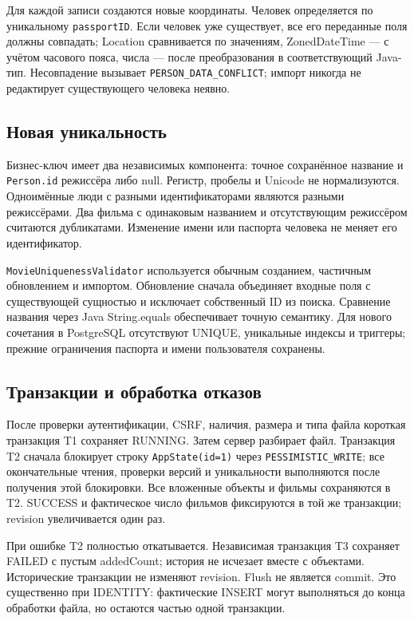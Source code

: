 Для каждой записи создаются новые координаты. Человек определяется по уникальному \texttt{passportID}. Если человек уже существует, все его переданные поля должны совпадать; Location сравнивается по значениям, ZonedDateTime --- с учётом часового пояса, числа --- после преобразования в соответствующий Java-тип. Несовпадение вызывает \texttt{PERSON\_DATA\_CONFLICT}; импорт никогда не редактирует существующего человека неявно.

\subsection{Новая уникальность}
Бизнес-ключ имеет два независимых компонента: точное сохранённое название и \texttt{Person.id} режиссёра либо null. Регистр, пробелы и Unicode не нормализуются. Одноимённые люди с разными идентификаторами являются разными режиссёрами. Два фильма с одинаковым названием и отсутствующим режиссёром считаются дубликатами. Изменение имени или паспорта человека не меняет его идентификатор.

\texttt{MovieUniquenessValidator} используется обычным созданием, частичным обновлением и импортом. Обновление сначала объединяет входные поля с существующей сущностью и исключает собственный ID из поиска. Сравнение названия через Java String.equals обеспечивает точную семантику. Для нового сочетания в PostgreSQL отсутствуют UNIQUE, уникальные индексы и триггеры; прежние ограничения паспорта и имени пользователя сохранены.

\subsection{Транзакции и обработка отказов}
После проверки аутентификации, CSRF, наличия, размера и типа файла короткая транзакция T1 сохраняет RUNNING. Затем сервер разбирает файл. Транзакция T2 сначала блокирует строку \texttt{AppState(id=1)} через \texttt{PESSIMISTIC\_WRITE}; все окончательные чтения, проверки версий и уникальности выполняются после получения этой блокировки. Все вложенные объекты и фильмы сохраняются в T2. SUCCESS и фактическое число фильмов фиксируются в той же транзакции; revision увеличивается один раз.

При ошибке T2 полностью откатывается. Независимая транзакция T3 сохраняет FAILED с пустым addedCount; история не исчезает вместе с объектами. Исторические транзакции не изменяют revision. Flush не является commit. Это существенно при IDENTITY: фактические INSERT могут выполняться до конца обработки файла, но остаются частью одной транзакции.

